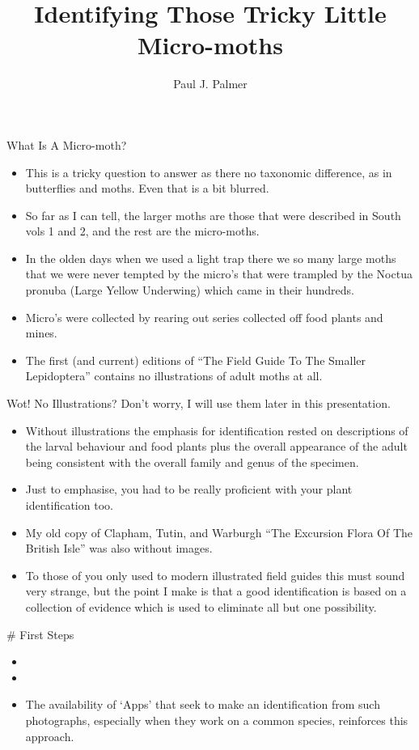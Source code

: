 \documentclass[
  ignorenonframetext,
]{beamer}
\title{Identifying Those Tricky Little Micro-moths}
\author{Paul J. Palmer}
\date{}
\providecommand{\tightlist}{%
  \setlength{\itemsep}{0pt}\setlength{\parskip}{0pt}}
\begin{document}
\frame{\titlepage}

\begin{frame}{What Is A Micro-moth?}
\protect\hypertarget{what-is-a-micro-moth}{}
\begin{itemize}
\tightlist
\item
  This is a tricky question to answer as there no taxonomic difference,
  as in butterflies and moths. Even that is a bit blurred.
\item
  So far as I can tell, the larger moths are those that were described
  in South vols 1 and 2, and the rest are the micro-moths.
\item
  In the olden days when we used a light trap there we so many large
  moths that we were never tempted by the micro's that were trampled by
  the Noctua pronuba (Large Yellow Underwing) which came in their
  hundreds.
\item
  Micro's were collected by rearing out series collected off food plants
  and mines.
\item
  The first (and current) editions of ``The Field Guide To The Smaller
  Lepidoptera'' contains no illustrations of adult moths at all.
\end{itemize}
\end{frame}

\begin{frame}{Wot! No Illustrations?}
\protect\hypertarget{wot-no-illustrations}{}
Don't worry, I will use them later in this presentation.

\begin{itemize}
\tightlist
\item
  Without illustrations the emphasis for identification rested on
  descriptions of the larval behaviour and food plants plus the overall
  appearance of the adult being consistent with the overall family and
  genus of the specimen.
\item
  Just to emphasise, you had to be really proficient with your plant
  identification too.
\item
  My old copy of Clapham, Tutin, and Warburgh ``The Excursion Flora Of
  The British Isle'' was also without images.
\item
  To those of you only used to modern illustrated field guides this must
  sound very strange, but the point I make is that a good identification
  is based on a collection of evidence which is used to eliminate all
  but one possibility.
\end{itemize}

\begin{block}{\# First Steps}
\protect\hypertarget{first-steps}{}
\begin{itemize}
\tightlist
\item
\item
\item
  The availability of `Apps' that seek to make an identification from
  such photographs, especially when they work on a common species,
  reinforces this approach.
\end{itemize}
\end{block}
\end{frame}
\end{document}
